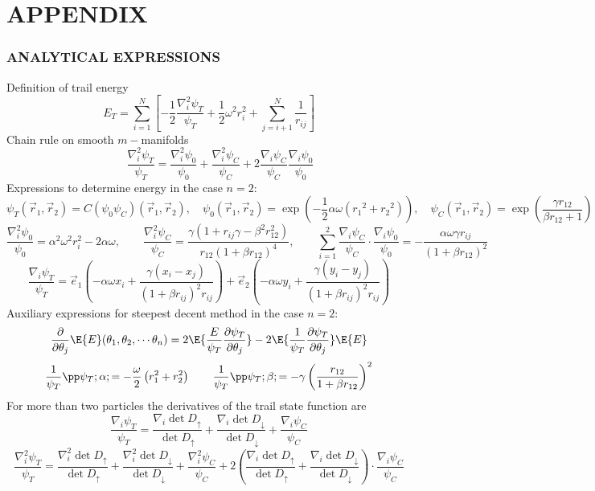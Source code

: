 \documentclass[11pt,english,a4paper]{article}
\begin{document}
\section*{\uppercase{Appendix}}
\subsubsection*{\uppercase{analytical expressions}}
Definition of trail energy
\begin{equation}
E_T = \sum_{i=1}^N \left[ -\frac{1}{2} \frac{\nabla^2_i \psi_T}{\psi_T} + \frac{1}{2} \omega^2 r_i^2 + \sum_{j=i+1}^N \frac{1}{r_{ij}} \right]
\end{equation}
Chain rule on smooth $m-$manifolds
\[
 \qquad \frac{\nabla_i^2 \psi_T}{\psi_T} = \frac{\nabla_i^2 \psi_0}{\psi_0} + \frac{\nabla_i^2 \psi_C}{\psi_C} + 2\frac{\nabla_i \psi_C}{\psi_C}\frac{\nabla_i \psi_0}{\psi_0}
\]
Expressions to determine energy in the case $n=2$:
\[
\psi_T(\vec{r}_1, \vec{r}_2) = C(\psi_0 \psi_C)(\vec{r}_1, \vec{r}_2), \quad  \psi_0(\vec{r}_1, \vec{r}_2) = \exp \left(-\frac{1}{2} \alpha  \omega  \left( {{r}_1}^2+  {{r}_2}^2\right)\right),  \quad  \psi_C(\vec{r}_1, \vec{r}_2) =  \exp \left( \frac{\gamma r_{  12}}{\beta  r_{  12}+1} \right)
\]
\[
\frac{\nabla_i^2 \psi_0}{\psi_0} = \alpha^2 \omega^2 r_i^2 - 2 \alpha \omega, \qquad
\frac{\nabla_i^2 \psi_C}{\psi_C} = \frac{\gamma (1 + r_{ij} \gamma - \beta^2 r_{  12}^2)}{r_{  12}(1 + \beta r_{  12})^4}, \qquad \sum_{i=1}^2 \frac{\nabla_i \psi_C}{\psi_C}\cdot \frac{\nabla_i \psi_0}{\psi_0} = - \frac{\alpha \omega \gamma r_{ij}}{(1 + \beta r_{12})^2}
\]
\[
\frac{\nabla_i \psi_T}{\psi_T} = \vec{e}_1 \left( -\alpha \omega x_i + \frac{\gamma(x_i - x_j)}{(1 + \beta r_{ij})^2r_{ij}} \right) + \vec{e}_2 \left( - \alpha \omega y_i + \frac{\gamma(y_i-y_j)}{(1 + \beta r_{ij})^2r_{ij}} \right)
\]
Auxiliary expressions for steepest decent method in the case $n=2$:
\[
\frac{\partial}{\partial \theta_j} \E{E}(\theta_1,\theta_2,\cdots \theta_n) = 2 \E{\frac{E}{\psi_T} \frac{\partial \psi_T}{\partial \theta_j} } - 2\E{\frac{1}{\psi_T} \frac{\partial \psi_T}{\partial \theta_j} }\E{E}
\]
\[
\frac{1}{\psi_T}\pp \psi_T; \alpha; = - \frac{\omega}{2} \left( r_1^2 + r_2^2 \right) \qquad 
\frac{1}{\psi_T}\pp \psi_T; \beta; = - \gamma \left( \frac{r_{12}}{1 + \beta r_{12}} \right)^2
\]
For more than two particles the derivatives of the trail state function are
\[
\frac{\nabla_i \psi_T}{\psi_T} = \frac{\nabla_i \det D_\uparrow}{\det D_\uparrow} + \frac{\nabla_i \det D_\downarrow}{\det D_\downarrow} + \frac{\nabla_i \psi_C}{\psi_C}
\]
\[
\frac{\nabla_i^2 \psi_T}{\psi_T} = \frac{\nabla_i^2 \det D_\uparrow}{\det D_\uparrow} + \frac{\nabla_i^2 \det D_\downarrow}{\det D_\downarrow} + \frac{\nabla_i^2 \psi_C}{\psi_C} + 2\left( \frac{\nabla_i \det D_\uparrow}{\det D_\uparrow} + \frac{\nabla_i \det D_\downarrow}{\det D_\downarrow} \right) \cdot \frac{\nabla_i \psi_C}{\psi_C}
\]
\end{document}
